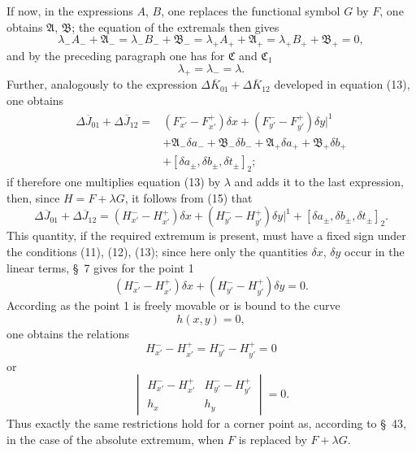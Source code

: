 \documentclass[11pt,a4paper,leqno]{article}
\begin{document}
If now, in the expressions $A$, $B$, one replaces the functional symbol $G$ by $F$, one obtains $\mathfrak A$, $\mathfrak B$; the equation of the extremals then gives
\begin{equation}\tag{15}
\lambda_-A_-+\mathfrak A_-=
\lambda_-B_-+\mathfrak B_-=
\lambda_+A_+ +\mathfrak A_+=
\lambda_+B_+ +\mathfrak B_+=0,
\end{equation}
and by the preceding paragraph one has for $\mathfrak C$ and $\mathfrak C_1$
\[
\lambda_+=\lambda_-=\lambda.
\]
Further, analogously to the expression $\Delta\overline K_{01}+\Delta\overline K_{12}$ developed in equation (13), one obtains
\[
\begin{aligned}
\Delta\overline J_{01}+\Delta\overline J_{12}
={}&(F_{x'}^- -F_{x'}^+)\delta x+(F_{y'}^- -F_{y'}^+)\delta y\bigg|^1\\
&+\mathfrak A_-\delta a_-+\mathfrak B_-\delta b_-+\mathfrak A_+\delta a_+ +\mathfrak B_+\delta b_+ \\
&+[\delta a_\pm,\delta b_\pm,\delta t_\pm]_2;
\end{aligned}
\]
if therefore one multiplies equation (13) by $\lambda$ and adds it to the last expression, then, since $H=F+\lambda G$, it follows from (15) that
\[
\Delta\overline J_{01}+\Delta\overline J_{12}
=(H_{x'}^- -H_{x'}^+)\delta x+(H_{y'}^- -H_{y'}^+)\delta y\bigg|^1
+[\delta a_\pm,\delta b_\pm,\delta t_\pm]_2.
\]
This quantity, if the required extremum is present, must have a fixed sign under the conditions (11), (12), (13); since here only the quantities $\delta x$, $\delta y$ occur in the linear terms, \S~7 gives for the point 1
\begin{equation}\tag{16}
(H_{x'}^- -H_{x'}^+)\delta x+(H_{y'}^- -H_{y'}^+)\delta y=0.
\end{equation}
According as the point 1 is freely movable or is bound to the curve
\[
h(x,y)=0,
\]
one obtains the relations
\[
H_{x'}^- -H_{x'}^+=H_{y'}^- -H_{y'}^+=0
\]
or
\[
\begin{vmatrix}
H_{x'}^- -H_{x'}^+&H_{y'}^- -H_{y'}^+\\
h_x&h_y
\end{vmatrix}=0.
\]
Thus exactly the same restrictions hold for a corner point as, according to \S~43, in the case of the absolute extremum, when $F$ is replaced by $F+\lambda G$.
\end{document}
